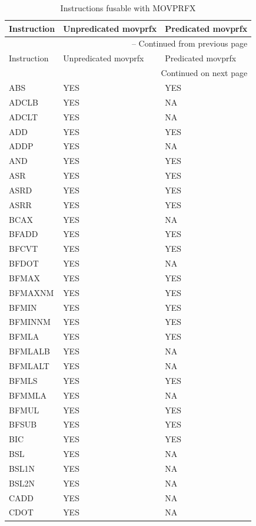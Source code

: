 \begin{longtable}{|l|l|l|}
\caption{Instructions fusable with MOVPRFX} \\
\hline
Instruction & Unpredicated movprfx & Predicated movprfx\\
\hline
\endfirsthead
\hline
\multicolumn{3}{|r|}{{\tablename\ \thetable{} -- Continued from previous page}} \\
\hline
Instruction & Unpredicated movprfx & Predicated movprfx\\
\hline
\endhead
\hline
\multicolumn{3}{|r|}{{Continued on next page}} \\
\hline
\endfoot
\hline
\endlastfoot
ABS & YES & YES\\
\hline
ADCLB & YES & NA\\
\hline
ADCLT & YES & NA\\
\hline
ADD & YES & YES\\
\hline
ADDP & YES & NA\\
\hline
AND & YES & YES\\
\hline
ASR & YES & YES\\
\hline
ASRD & YES & YES\\
\hline
ASRR & YES & YES\\
\hline
BCAX & YES & NA\\
\hline
BFADD & YES & YES\\
\hline
BFCVT & YES & YES\\
\hline
BFDOT & YES & NA\\
\hline
BFMAX & YES & YES\\
\hline
BFMAXNM & YES & YES\\
\hline
BFMIN & YES & YES\\
\hline
BFMINNM & YES & YES\\
\hline
BFMLA & YES & YES\\
\hline
BFMLALB & YES & NA\\
\hline
BFMLALT & YES & NA\\
\hline
BFMLS & YES & YES\\
\hline
BFMMLA & YES & NA\\
\hline
BFMUL & YES & YES\\
\hline
BFSUB & YES & YES\\
\hline
BIC & YES & YES\\
\hline
BSL & YES & NA\\
\hline
BSL1N & YES & NA\\
\hline
BSL2N & YES & NA\\
\hline
CADD & YES & NA\\
\hline
CDOT & YES & NA\\

\end{longtable}

